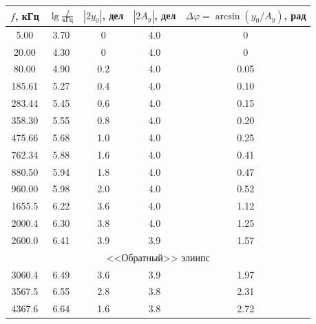 \documentclass[14pt]{article}
\begin{document}
\begin{center}
\begin{tabular}{|c|c|c|c|c|}
\hline
$f$, кГц	&	$\lg \frac{f}{\text{кГц}}$ &	$|2y_0|$, дел	&	$|2A_y|$, дел	&	$\Delta \varphi = \arcsin (y_0/A_y)$, рад\\
\hline
5.00		&	3.70						&	0				&	4.0				&	0							\\
\hline
20.00		&	4.30						&	0				&	4.0				&	0							\\
\hline
80.00		&	4.90						&	0.2				&	4.0				&	0.05						\\
\hline
185.61		&	5.27						&	0.4				&	4.0				&	0.10						\\
\hline
283.44		&	5.45						&	0.6				&	4.0				&	0.15						\\
\hline
358.30		&	5.55						&	0.8				&	4.0				&	0.20						\\
\hline
475.66		&	5.68						&	1.0				&	4.0				&	0.25						\\
\hline
762.34		&	5.88						&	1.6				&	4.0				&	0.41						\\
\hline
880.50		&	5.94						&	1.8				&	4.0				&	0.47						\\
\hline
960.00		&	5.98						&	2.0				&	4.0				&	0.52						\\
\hline
1655.5		&	6.22						&	3.6				&	4.0				&	1.12						\\
\hline
2000.4		&	6.30						&	3.8				&	4.0				&	1.25						\\
\hline
2600.0		&	6.41						&	3.9				&	3.9				&	1.57						\\
\hline
\multicolumn{5}{|c|}{$\text{<<Обратный>> элиипс}$}\\
\hline
3060.4		&	6.49						&	3.6				&	3.9				&	1.97						\\
\hline
3567.5		&	6.55						&	2.8				&	3.8				&	2.31						\\
\hline
4367.6		&	6.64						&	1.6				&	3.8				&	2.72						\\
\hline
\end{tabular}
\end{center}

%
%

\begin{center}
\end{center}
\end{document}
